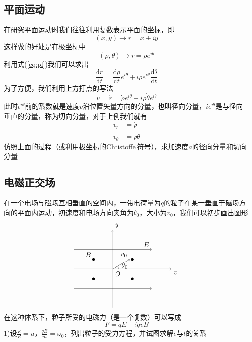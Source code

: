 \documentclass[UTF8]{ctexart}
\newcommand{\D}{\mathrm{d}}
\begin{document}
\subsection{平面运动}
在研究平面运动时我们往往利用复数表示平面的坐标，即
\[(x,y) \rightarrow r = x+ iy\]
这样做的好处是在极坐标中
\begin{equation}
    (\rho,\theta) \rightarrow r = \rho e^{i\theta} \label{eq:pl}
\end{equation}
利用式(\ref{eq:pl})我们可以求出
\[\frac{\D r}{\D t } = \frac{\D \rho}{\D t}e^{i\theta}+i\rho e^{i\theta}\frac{\D \theta}{\D t}\]
为了方便，我们利用上方打点的写法
\begin{equation}
    v = \dot{r} = \dot{\rho}e^{i\theta}+i\rho \dot{\theta} e^{i\theta} \label{eq:plv}
\end{equation}
此时$e^{i\theta}$前的系数就是速度$v$沿位置矢量方向的分量，也叫径向分量，$ie^{i\theta}$是与径向垂直的分量，称为切向分量，对于上例我们就有
\begin{align*}
    v_r &=  \dot{\rho}\\
    v_\theta&=\rho \dot{\theta}
\end{align*}
仿照上面的过程（或利用极坐标的Christoffel符号），求加速度$a$的径向分量和切向分量
\subsection{电磁正交场}
在一个电场与磁场互相垂直的空间内，一带电荷量为$q$的粒子在某一垂直于磁场方向的平面内运动，初速度和电场方向夹角为$\theta_0$，大小为$v_0$，我们可以初步画出图形
\[
\begin{tikzpicture}
    \draw[->] (-2,1) -- (2,1); 
    \draw[->] (-2,0) -- (3,0); 
    \draw[->] (-2,-1) -- (2,-1); 
    \draw[->] (0,-2) -- (0,2);
    \node[above left] (A) at (2,1) {$E$};
    \node[below right] (B) at (3,0) {$x$};
    \node[above right] (C) at (0,2) {$y$};
    \node[below right] (O) at (0,0) {$O$};
    \fill (-1,0.5) circle (2pt);
    \fill (-1,-0.5) circle (2pt);
    \fill (1,0.5) circle (2pt);
    \fill (1,-0.5) circle (2pt);
    \node[above left] (A) at (-1,0.5) {$B$};
    \draw[->] (0,0) -- (30:1);
    \node[above left] (O) at (30:1) {$v_0$};
    \node[below right] (O) at (0.33,0.44) {$\theta_0$};
    \draw (0:0.3) arc [start angle=0, end angle=30, radius=0.3cm];
\end{tikzpicture}
\]
在这种体系下，粒子所受的电磁力（是一个复数）可以写成
\[F = qE - i qv B\]
1)设$\frac{E}{B}=u$，$\frac{qB}{m}=\omega_0$，列出粒子的受力方程，并试图求解$v$与$t$的关系
\end{document}
